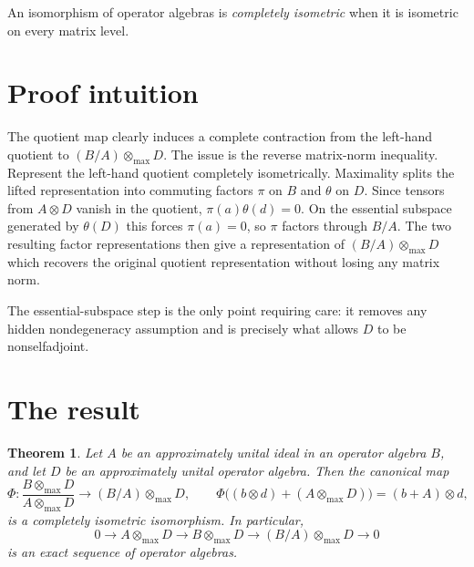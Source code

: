 \documentclass[11pt]{article}
\newtheorem{theorem}{Theorem}
\newcommand{\otmax}{\mathbin{\otimes_{\max}}}
\begin{document}
An isomorphism of operator algebras is \emph{completely isometric} when it is
isometric on every matrix level.

\section{Proof intuition}

The quotient map clearly induces a complete contraction from the left-hand
quotient to $(B/A)\otmax D$.  The issue is the reverse matrix-norm inequality.
Represent the left-hand quotient completely isometrically.  Maximality splits
the lifted representation into commuting factors $\pi$ on $B$ and $\theta$
on $D$.  Since tensors from $A\otimes D$ vanish in the quotient,
$\pi(a)\theta(d)=0$.  On the essential subspace generated by $\theta(D)$ this
forces $\pi(a)=0$, so $\pi$ factors through $B/A$.  The two resulting factor
representations then give a representation of $(B/A)\otmax D$ which recovers
the original quotient representation without losing any matrix norm.

The essential-subspace step is the only point requiring care: it removes any
hidden nondegeneracy assumption and is precisely what allows $D$ to be
nonselfadjoint.

\section{The result}

\begin{theorem}\label{thm:main}
Let $A$ be an approximately unital ideal in an operator algebra $B$, and let
$D$ be an approximately unital operator algebra.  Then the canonical map
\[
 \Phi:\frac{B\otmax D}{A\otmax D}\longrightarrow (B/A)\otmax D,
 \qquad
 \Phi\bigl((b\otimes d)+(A\otmax D)\bigr)=(b+A)\otimes d,
\]
is a completely isometric isomorphism.  In particular,
\[
 0\longrightarrow A\otmax D\longrightarrow B\otmax D
 \longrightarrow (B/A)\otmax D\longrightarrow 0
\]
is an exact sequence of operator algebras.
\end{theorem}
\end{document}
